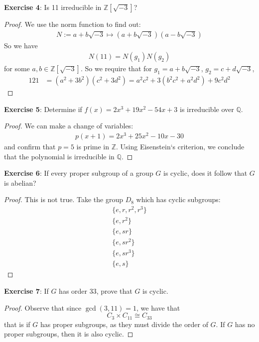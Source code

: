\documentclass{article}
\begin{document}
\textbf{Exercise 4}: Is 11 irreducible in $\mathbb{Z}[\sqrt{-3}]$?
\begin{proof}
	We use the norm function to find out:
	\begin{align*}
		N := a + b\sqrt{-3} \mapsto (a + b\sqrt{-3})(a - b\sqrt{-3})
	\end{align*}
	So we have
	\begin{align*}
		N(11) = N(g_{1})N(g_{2})
	\end{align*}
	for some $a, b \in \mathbb{Z}[\sqrt{-3}]$. So we require that for $g_{1} = a + b\sqrt{-3}$, $g_{2} = c + d\sqrt{-3}$, 
	\begin{align*}
		121 &= (a^{2} + 3b^{2})(c^{2} + 3d^{2}) = a^{2}c^{2} + 3(b^{2}c^{2} + a^{2}d^{2}) + 9c^{2}d^{2}
	\end{align*}
\end{proof}

\textbf{Exercise 5}: Determine if $f(x) = 2x^{3} + 19x^{2} - 54x + 3$ is irreducible over $\mathbb{Q}$.
\begin{proof}
    We can make a change of variables:
    \begin{align*}
        p(x + 1) = 2x^{3} + 25x^{2} - 10x - 30
    \end{align*}
    and confirm that $p = 5$ is prime in $\mathbb{Z}$. Using Eisenstein`s criterion, we conclude that the polynomial is irreducible in $\mathbb{Q}$.
\end{proof}

\textbf{Exercise 6}: If every proper subgroup of a group $G$ is cyclic, does it follow that $G$ is abelian?
\begin{proof}
	This is not true. Take the group $D_{8}$ which has cyclic subgroups:
	\begin{gather*}
		\{e, r, r^{2}, r^{3}\} \\
		\{e, r^{2}\} \\
		\{e, sr\} \\
		\{e, sr^{2}\} \\
		\{e, sr^{3} \} \\
		\{e, s\}
	\end{gather*}
\end{proof}

\textbf{Exercise 7}: If $G$ has order 33, prove that $G$ is cyclic.
\begin{proof}
	Observe that since $\gcd{(3, 11)} = 1$, we have that 
	\begin{equation*}
		C_{3} \times C_{11} \cong C_{33}
	\end{equation*}
	that is if $G$ has proper subgroups, as they must divide the order of $G$. If $G$ has no proper subgroups, then it is also cyclic.
\end{proof}
\end{document}

